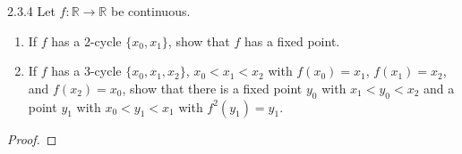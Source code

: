\begin{problem}{2.3.4}
  Let $f: \mathbb{R} \to \mathbb{R}$ be continuous.
  \begin{enumerate}
    \item If $f$ has a 2-cycle $\{x_0, x_1\}$, show that $f$ has a fixed point.
    \item If $f$ has a 3-cycle $\{x_0, x_1, x_2\}$, $x_0 < x_1 < x_2$ with $f(x_0) = x_1$,
      $f(x_1) = x_2$, and $f(x_2) = x_0$, show that there is a fixed point $y_0$ with
      $x_1 < y_0 < x_2$ and a point $y_1$ with $x_0 < y_1 < x_1$ with $f^2(y_1) = y_1$.
  \end{enumerate}
 \end{problem}

\begin{proof}
\end{proof}
\newpage
